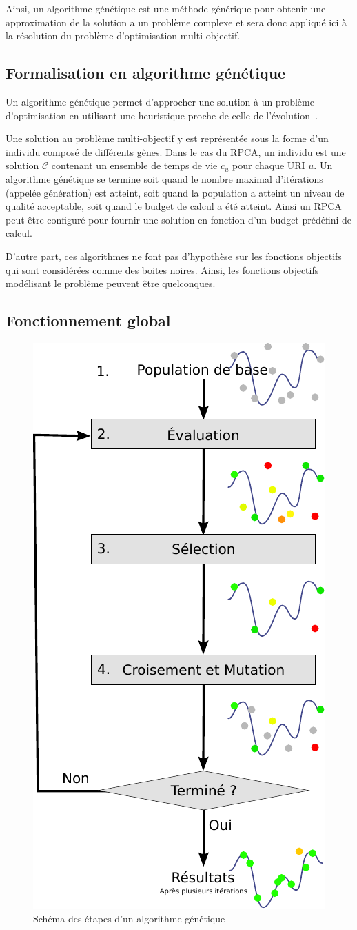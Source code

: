 Ainsi, un algorithme génétique est une méthode générique pour obtenir une approximation de la solution a un problème complexe et sera donc appliqué ici à la résolution du problème d'optimisation multi-objectif.

\subsection{Formalisation en algorithme génétique}

Un algorithme génétique permet d'approcher une solution à un problème d'optimisation en utilisant une heuristique proche de celle de l'évolution~\cite{Luke2013Metaheuristics}.

Une solution au problème multi-objectif y est représentée sous la forme d'un individu composé de différents gènes.
Dans le cas du \ac{RPCA}, un individu est une solution $\mathcal{C}$ contenant un ensemble de temps de vie $c_u$ pour chaque \ac{URI} $u$.
Un algorithme génétique se termine soit quand le nombre maximal d'itérations (appelée génération) est atteint, soit quand la population a atteint un niveau de qualité acceptable, soit quand le budget de calcul a été atteint.
Ainsi un \ac{RPCA} peut être configuré pour fournir une solution en fonction d'un budget prédéfini de calcul.

D'autre part, ces algorithmes ne font pas d'hypothèse sur les fonctions objectifs qui sont considérées comme des boites noires.
Ainsi, les fonctions objectifs modélisant le problème peuvent être quelconques.

\subsection{Fonctionnement global}

\begin{figure}[h!]
  \centering
  \includegraphics[width=.4\textwidth]{img/algo_genetique.pdf}
  \caption{Schéma des étapes d'un algorithme génétique}
  \label{cache:fig:genetic_schema}
\end{figure}

